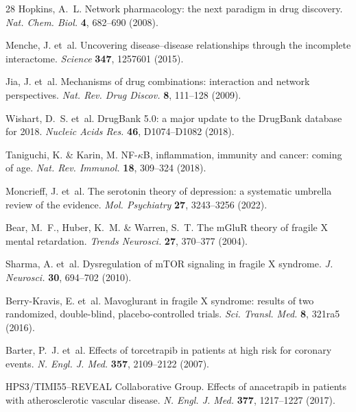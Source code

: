 \documentclass[11pt,a4paper]{article}
\begin{document}
\begin{thebibliography}{28}
Hopkins, A.~L.
\newblock Network pharmacology: the next paradigm in drug discovery.
\newblock \emph{Nat. Chem. Biol.} \textbf{4}, 682--690 (2008).

Menche, J. et~al.
\newblock Uncovering disease--disease relationships through the incomplete interactome.
\newblock \emph{Science} \textbf{347}, 1257601 (2015).

Jia, J. et~al.
\newblock Mechanisms of drug combinations: interaction and network perspectives.
\newblock \emph{Nat. Rev. Drug Discov.} \textbf{8}, 111--128 (2009).

Wishart, D.~S. et~al.
\newblock DrugBank 5.0: a major update to the DrugBank database for 2018.
\newblock \emph{Nucleic Acids Res.} \textbf{46}, D1074--D1082 (2018).

Taniguchi, K. \& Karin, M.
\newblock NF-$\kappa$B, inflammation, immunity and cancer: coming of age.
\newblock \emph{Nat. Rev. Immunol.} \textbf{18}, 309--324 (2018).

Moncrieff, J. et~al.
\newblock The serotonin theory of depression: a systematic umbrella review of the evidence.
\newblock \emph{Mol. Psychiatry} \textbf{27}, 3243--3256 (2022).

Bear, M.~F., Huber, K.~M. \& Warren, S.~T.
\newblock The mGluR theory of fragile X mental retardation.
\newblock \emph{Trends Neurosci.} \textbf{27}, 370--377 (2004).

Sharma, A. et~al.
\newblock Dysregulation of mTOR signaling in fragile X syndrome.
\newblock \emph{J. Neurosci.} \textbf{30}, 694--702 (2010).

Berry-Kravis, E. et~al.
\newblock Mavoglurant in fragile X syndrome: results of two randomized, double-blind, placebo-controlled trials.
\newblock \emph{Sci. Transl. Med.} \textbf{8}, 321ra5 (2016).

Barter, P.~J. et~al.
\newblock Effects of torcetrapib in patients at high risk for coronary events.
\newblock \emph{N. Engl. J. Med.} \textbf{357}, 2109--2122 (2007).

{HPS3/TIMI55--REVEAL Collaborative Group}.
\newblock Effects of anacetrapib in patients with atherosclerotic vascular disease.
\newblock \emph{N. Engl. J. Med.} \textbf{377}, 1217--1227 (2017).


\end{thebibliography}
\end{document}
